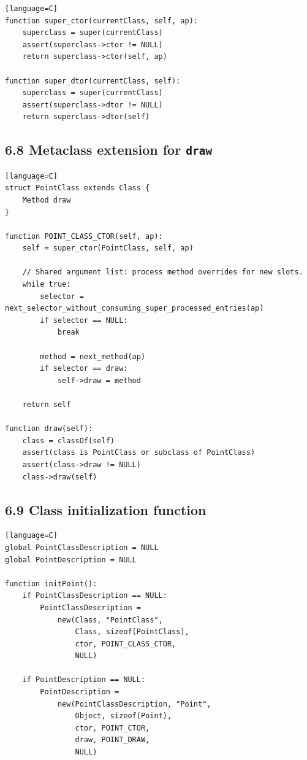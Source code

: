 \documentclass[11pt]{article}
\begin{document}
\begin{verbatim}[language=C]
function super_ctor(currentClass, self, ap):
    superclass = super(currentClass)
    assert(superclass->ctor != NULL)
    return superclass->ctor(self, ap)

function super_dtor(currentClass, self):
    superclass = super(currentClass)
    assert(superclass->dtor != NULL)
    return superclass->dtor(self)
\end{verbatim}

\subsection{\texorpdfstring{6.8 Metaclass extension for
\texttt{draw}}{6.8 Metaclass extension for draw}}\label{metaclass-extension-for-draw}

\begin{verbatim}[language=C]
struct PointClass extends Class {
    Method draw
}

function POINT_CLASS_CTOR(self, ap):
    self = super_ctor(PointClass, self, ap)

    // Shared argument list: process method overrides for new slots.
    while true:
        selector = next_selector_without_consuming_super_processed_entries(ap)
        if selector == NULL:
            break

        method = next_method(ap)
        if selector == draw:
            self->draw = method

    return self

function draw(self):
    class = classOf(self)
    assert(class is PointClass or subclass of PointClass)
    assert(class->draw != NULL)
    class->draw(self)
\end{verbatim}

\subsection{6.9 Class initialization
function}\label{class-initialization-function}

\begin{verbatim}[language=C]
global PointClassDescription = NULL
global PointDescription = NULL

function initPoint():
    if PointClassDescription == NULL:
        PointClassDescription =
            new(Class, "PointClass",
                Class, sizeof(PointClass),
                ctor, POINT_CLASS_CTOR,
                NULL)

    if PointDescription == NULL:
        PointDescription =
            new(PointClassDescription, "Point",
                Object, sizeof(Point),
                ctor, POINT_CTOR,
                draw, POINT_DRAW,
                NULL)
\end{verbatim}
\end{document}
